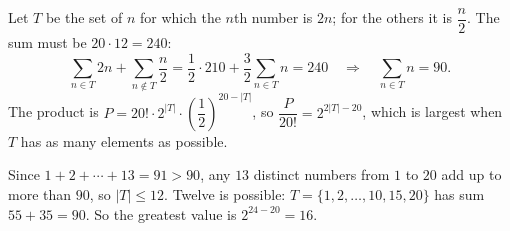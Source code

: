 Let $T$ be the set of $n$ for which the $n$th number is $2n$; for the others it is $\dfrac {n}{2}$. The sum must be $20\cdot12=240$:
\[
\sum_{n\in T}2n+\sum_{n\notin T}\dfrac {n}{2}=\dfrac{1}{2}\cdot210+\dfrac{3}{2}\sum_{n\in T}n=240\quad\Longrightarrow\quad\sum_{n\in T}n=90 .
\]
The product is $P=20!\cdot2^{|T|}\cdot\left(\dfrac{1}{2}\right)^{20-|T|}$, so $\dfrac{P}{20!}=2^{2|T|-20}$, which is largest when $T$ has as many elements as possible.

Since $1+2+\cdots+13=91>90$, any $13$ distinct numbers from $1$ to $20$ add up to more than $90$, so $|T|\le12$. Twelve is possible: $T=\{1,2,\dots,10,15,20\}$ has sum $55+35=90$. So the greatest value is $2^{24-20}=\boxed{16}$.
